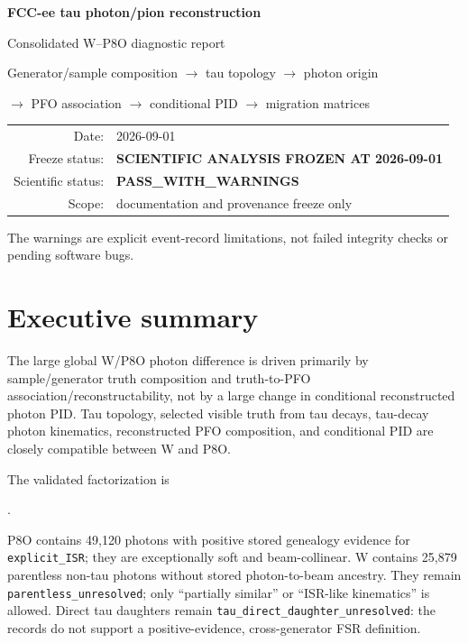 \documentclass[11pt,a4paper]{article}
\newcommand{\code}[1]{\texttt{#1}}
\begin{document}
\begin{titlepage}
\centering
\vspace*{22mm}
{\Huge\bfseries\color{navy} FCC-ee tau photon/pion reconstruction\par}
\vspace{5mm}
{\LARGE Consolidated W--P8O diagnostic report\par}
\vspace{14mm}
{\large Generator/sample composition $\rightarrow$ tau topology $\rightarrow$ photon origin\par}
{\large $\rightarrow$ PFO association $\rightarrow$ conditional PID $\rightarrow$ migration matrices\par}
\vfill
\begin{tabular}{rl}
Date: & 2026-09-01\\
Freeze status: & \textbf{SCIENTIFIC ANALYSIS FROZEN AT 2026-09-01}\\
Scientific status: & \textbf{PASS\_WITH\_WARNINGS}\\
Scope: & documentation and provenance freeze only
\end{tabular}
\vfill
{\small The warnings are explicit event-record limitations, not failed integrity checks or pending software bugs.\par}
\end{titlepage}

\tableofcontents
\clearpage

\section{Executive summary}

The large global W/P8O photon difference is driven primarily by sample/generator truth composition and truth-to-PFO association/reconstructability, not by a large change in conditional reconstructed photon PID. Tau topology, selected visible truth from tau decays, tau-decay photon kinematics, reconstructed PFO composition, and conditional PID are closely compatible between W and P8O.

The validated factorization is
\begin{center}
.
\end{center}

P8O contains 49,120 photons with positive stored genealogy evidence for \code{explicit\_ISR}; they are exceptionally soft and beam-collinear. W contains 25,879 parentless non-tau photons without stored photon-to-beam ancestry. They remain \code{parentless\_unresolved}; only ``partially similar'' or ``ISR-like kinematics'' is allowed. Direct tau daughters remain \code{tau\_direct\_daughter\_unresolved}: the records do not support a positive-evidence, cross-generator FSR definition.
\end{document}
